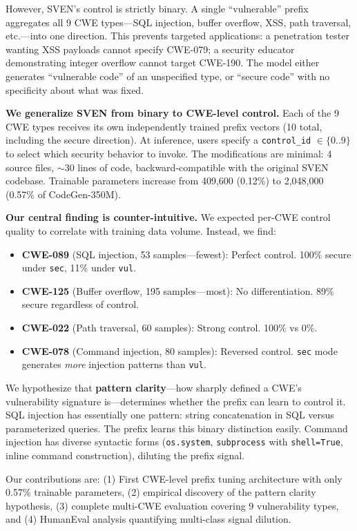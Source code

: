 \documentclass[conference]{IEEEtran}
\begin{document}
However, SVEN's control is strictly binary. A single ``vulnerable'' prefix aggregates all 9 CWE types—SQL injection, buffer overflow, XSS, path traversal, etc.—into one direction. This prevents targeted applications: a penetration tester wanting XSS payloads cannot specify CWE-079; a security educator demonstrating integer overflow cannot target CWE-190. The model either generates ``vulnerable code'' of an unspecified type, or ``secure code'' with no specificity about what was fixed.

\textbf{We generalize SVEN from binary to CWE-level control.} Each of the 9 CWE types receives its own independently trained prefix vectors (10 total, including the secure direction). At inference, users specify a \texttt{control\_id} $\in \{0..9\}$ to select which security behavior to invoke. The modifications are minimal: 4 source files, $\sim$30 lines of code, backward-compatible with the original SVEN codebase. Trainable parameters increase from 409,600 (0.12\%) to 2,048,000 (0.57\% of CodeGen-350M).

\textbf{Our central finding is counter-intuitive.} We expected per-CWE control quality to correlate with training data volume. Instead, we find:

\begin{itemize}
\item \textbf{CWE-089} (SQL injection, 53 samples—fewest): Perfect control. 100\% secure under \texttt{sec}, 11\% under \texttt{vul}.
\item \textbf{CWE-125} (Buffer overflow, 195 samples—most): No differentiation. 89\% secure regardless of control.
\item \textbf{CWE-022} (Path traversal, 60 samples): Strong control. 100\% vs 0\%.
\item \textbf{CWE-078} (Command injection, 80 samples): Reversed control. \texttt{sec} mode generates \textit{more} injection patterns than \texttt{vul}.
\end{itemize}

We hypothesize that \textbf{pattern clarity}—how sharply defined a CWE's vulnerability signature is—determines whether the prefix can learn to control it. SQL injection has essentially one pattern: string concatenation in SQL versus parameterized queries. The prefix learns this binary distinction easily. Command injection has diverse syntactic forms (\texttt{os.system}, \texttt{subprocess} with \texttt{shell=True}, inline command construction), diluting the prefix signal.

Our contributions are: (1) First CWE-level prefix tuning architecture with only 0.57\% trainable parameters, (2) empirical discovery of the pattern clarity hypothesis, (3) complete multi-CWE evaluation covering 9 vulnerability types, and (4) HumanEval analysis quantifying multi-class signal dilution.
\end{document}
